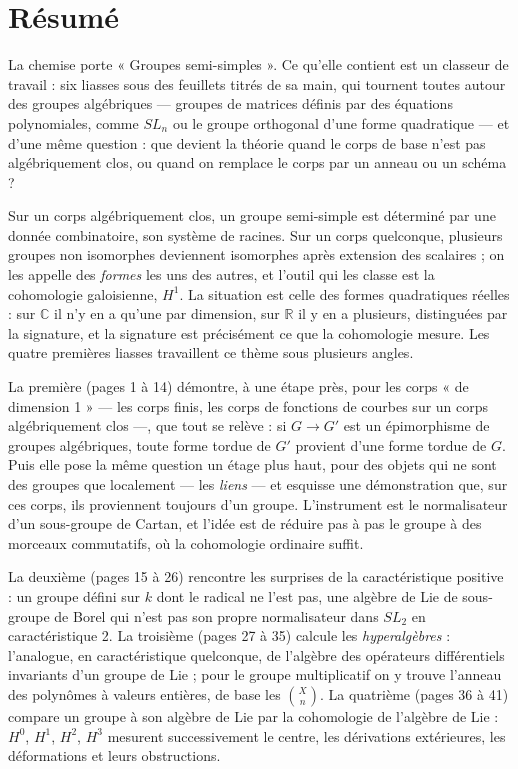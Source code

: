 \documentclass[11pt,a4paper]{article}
\begin{document}
\section*{Résumé}

\begin{resume}
La chemise porte « Groupes semi-simples ». Ce qu'elle contient est un classeur
de travail : six liasses sous des feuillets titrés de sa main, qui tournent
toutes autour des groupes algébriques — groupes de matrices définis par des
équations polynomiales, comme $SL_n$ ou le groupe orthogonal d'une forme
quadratique — et d'une même question : que devient la théorie quand le corps de
base n'est pas algébriquement clos, ou quand on remplace le corps par un anneau
ou un schéma ?

Sur un corps algébriquement clos, un groupe semi-simple est déterminé par une
donnée combinatoire, son système de racines. Sur un corps quelconque, plusieurs
groupes non isomorphes deviennent isomorphes après extension des scalaires ;
on les appelle des \emph{formes} les uns des autres, et l'outil qui les
classe est la cohomologie galoisienne, $H^1$. La situation est celle des
formes quadratiques réelles : sur $\mathbb{C}$ il n'y en a qu'une par
dimension, sur $\mathbb{R}$ il y en a plusieurs, distinguées par la signature,
et la signature est précisément ce que la cohomologie mesure. Les quatre
premières liasses travaillent ce thème sous plusieurs angles.

La première (pages 1 à 14) démontre, à une étape près, pour les corps « de dimension 1 » —
les corps finis, les corps de fonctions de courbes sur un corps
algébriquement clos —, que tout se relève : si $G \to G'$ est un épimorphisme de
groupes algébriques, toute forme tordue de $G'$ provient d'une forme tordue de
$G$. Puis elle pose la même question un étage plus haut, pour des objets qui
ne sont des groupes que localement — les \emph{liens} — et esquisse une
démonstration que, sur ces corps, ils proviennent toujours d'un groupe.
L'instrument est le normalisateur d'un sous-groupe de Cartan, et l'idée est
de réduire pas à pas le groupe à des morceaux commutatifs, où la cohomologie
ordinaire suffit.

La deuxième (pages 15 à 26) rencontre les surprises de la caractéristique
positive : un groupe défini sur $k$ dont le radical ne l'est pas, une algèbre de
Lie de sous-groupe de Borel qui n'est pas son propre normalisateur dans
$SL_2$ en caractéristique 2. La troisième (pages 27 à 35) calcule les
\emph{hyperalgèbres} : l'analogue, en caractéristique quelconque, de
l'algèbre des opérateurs différentiels invariants d'un groupe de Lie ; pour le
groupe multiplicatif on y trouve l'anneau des polynômes à valeurs entières,
de base les $\binom{X}{n}$. La quatrième (pages 36 à 41) compare un groupe à son
algèbre de Lie par la cohomologie de l'algèbre de Lie : $H^0$, $H^1$, $H^2$,
$H^3$ mesurent successivement le centre, les dérivations extérieures, les
déformations et leurs obstructions.


\end{resume}
\end{document}
